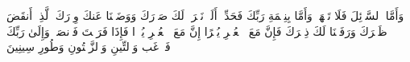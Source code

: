 \stopbuffer
\startbuffer[\q:93:10]
وَأَمَّا ٱلسَّاۤئِلَ فَلَا تَنۡهَرۡ%
\stopbuffer
\startbuffer[\q:93:11]
وَأَمَّا بِنِعۡمَةِ رَبِّكَ فَحَدِّثۡ%
\stopbuffer
\startbuffer[\q:94:1]
أَلَمۡ نَشۡرَحۡ لَكَ صَدۡرَكَ%
\stopbuffer
\startbuffer[\q:94:2]
وَوَضَعۡنَا عَنكَ وِزۡرَكَ%
\stopbuffer
\startbuffer[\q:94:3]
ٱلَّذِیۤ أَنقَضَ ظَهۡرَكَ%
\stopbuffer
\startbuffer[\q:94:4]
وَرَفَعۡنَا لَكَ ذِكۡرَكَ%
\stopbuffer
\startbuffer[\q:94:5]
فَإِنَّ مَعَ ٱلۡعُسۡرِ یُسۡرًا%
\stopbuffer
\startbuffer[\q:94:6]
إِنَّ مَعَ ٱلۡعُسۡرِ یُسۡرࣰا%
\stopbuffer
\startbuffer[\q:94:7]
فَإِذَا فَرَغۡتَ فَٱنصَبۡ%
\stopbuffer
\startbuffer[\q:94:8]
وَإِلَىٰ رَبِّكَ فَٱرۡغَب%
\stopbuffer
\startbuffer[\q:95:1]
وَٱلتِّینِ وَٱلزَّیۡتُونِ%
\stopbuffer
\startbuffer[\q:95:2]
وَطُورِ سِینِینَ%
\stopbuffer
